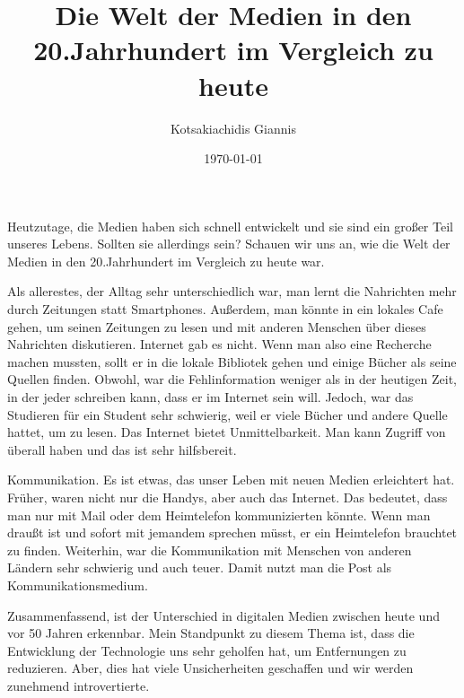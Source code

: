\documentclass{article}
\title{Die Welt der Medien in den 20.Jahrhundert im Vergleich zu heute}
\author{Kotsakiachidis Giannis }
\date{\today }
\begin{document}
	\maketitle
	

	\renewcommand{\baselinestretch}{1.5} 
	
	{\large Heutzutage, die Medien haben sich schnell entwickelt und sie sind ein großer Teil unseres Lebens. Sollten sie allerdings sein?
	Schauen wir uns an, wie die Welt der Medien in den 20.Jahrhundert im Vergleich zu heute war.
	
	Als allerestes, der Alltag sehr unterschiedlich war, man lernt die Nahrichten mehr durch Zeitungen statt Smartphones. Außerdem, man könnte in ein lokales Cafe gehen, um seinen Zeitungen zu lesen und mit anderen Menschen über dieses Nahrichten diskutieren. Internet gab es nicht. Wenn man also eine Recherche machen mussten, sollt er in die lokale Bibliotek gehen und einige Bücher als seine Quellen finden. Obwohl, war die Fehlinformation weniger als in der heutigen Zeit, in der jeder schreiben kann, dass er im Internet sein will. Jedoch, war das Studieren für ein Student sehr schwierig, weil er viele Bücher und andere Quelle hattet, um zu lesen. Das Internet bietet Unmittelbarkeit. Man kann Zugriff von überall haben und das ist sehr hilfsbereit.
	
	Kommunikation. Es ist etwas, das unser Leben mit neuen Medien erleichtert hat. Früher, waren nicht nur die Handys, aber auch das Internet. Das bedeutet, dass man nur mit Mail oder dem Heimtelefon kommunizierten könnte. Wenn man draußt ist und sofort mit jemandem sprechen müsst, er ein Heimtelefon brauchtet zu finden. Weiterhin, war die Kommunikation mit Menschen von anderen Ländern sehr schwierig und auch teuer. Damit nutzt man die Post als Kommunikationsmedium.
	
	Zusammenfassend, ist der Unterschied in digitalen Medien zwischen heute und vor 50 Jahren erkennbar. Mein Standpunkt zu diesem Thema ist, dass die Entwicklung der Technologie uns sehr geholfen hat, um Entfernungen zu reduzieren. Aber, dies hat viele Unsicherheiten geschaffen und wir werden zunehmend introvertierte.}
	

	


	
\end{document}
